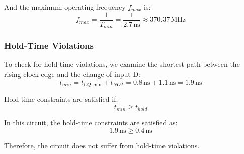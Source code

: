 \documentclass[12pt,openany]{book}
\begin{document}
And the maximum operating frequency $f_{max}$ is:
\[
f_{max} = \frac{1}{T_{min}} = \frac{1}{2.7 \, \text{ns}} \approx 370.37 \, \text{MHz}
\]

\subsubsection{Hold-Time Violations}

To check for hold-time violations, we examine the shortest path between the rising clock edge and the change of input D:
\[
t_{min} = t_{CQ,\text{min}} + t_{NOT} = 0.8 \, \text{ns} + 1.1 \, \text{ns} = 1.9 \, \text{ns}
\]

Hold-time constraints are satisfied if:
\[
t_{min} \ge t_{hold}
\]

In this circuit, the hold-time constraints are satisfied as:
\[
1.9 \, \text{ns} \ge 0.4 \, \text{ns}
\]

Therefore, the circuit does not suffer from hold-time violations.
\end{document}
